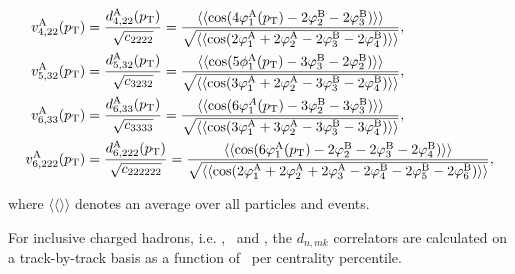 \documentclass[ALICE,manyauthors]{cernphprep}
\providecommand{\DIFaddbegin}{} %
\begin{document}
\begin{align}
v_{4,22}^{\rm{A}}(p_{\rm{T}}) &= \frac{d_{4,22}^{\rm{A}}(p_{\rm{T}})}{\sqrt{c_{2222}}} =  \frac{\langle\langle \cos(4\varphi^{\rm{A}}_{1}(p_{\rm{T}})-2\varphi^{\rm{B}}_{2}-2\varphi^{\rm{B}}_{3})\rangle\rangle}{\sqrt{\langle\langle \cos(2\varphi^{\rm{A}}_{1}+2\varphi^{\rm{A}}_{2}-2\varphi^{\rm{B}}_{3}-2\varphi^{\rm{B}}_{4}) \rangle\rangle}}, \label{Eq:VA422} \\
v_{5,32}^{\rm{A}}(p_{\rm{T}}) &= \frac{d_{5,32}^{\rm{A}}(p_{\rm{T}})}{\sqrt{c_{3232}}} = \frac{\langle\langle \cos(5\phi^{\rm{A}}_{1}(p_{\rm{T}})-3\varphi^{\rm{B}}_{3}-2\varphi^{\rm{B}}_{2})\rangle\rangle}{\sqrt{\langle\langle \cos(3\varphi^{\rm{A}}_{1}+2\varphi^{\rm{A}}_{2}-3\varphi^{\rm{B}}_{3}-2\varphi^{\rm{B}}_{4}) \rangle\rangle}}, \label{Eq:VA532}\\
v_{6,33}^{\rm{A}}(p_{\rm{T}}) &= \frac{d_{6,33}^{\rm{A}}(p_{\rm{T}})}{\sqrt{c_{3333}}} =\frac{\langle\langle \cos(6\varphi^{A}_{1}(p_{\rm{T}})-3\varphi^{\rm{B}}_{2}-3\varphi^{\rm{B}}_{3})\rangle\rangle}{\sqrt{\langle\langle \cos(3\varphi^{\rm{A}}_{1}+3\varphi^{\rm{A}}_{2}-3\varphi^{\rm{B}}_{3}-3\varphi^{\rm{B}}_{4}) \rangle\rangle}}, \label{Eq:VA633}\\
v_{6,222}^{\rm{A}}(p_{\rm{T}}) &= \frac{d_{6,222}^{\rm{A}}(p_{\rm{T}})}{\sqrt{c_{222222}}} =\frac{\langle\langle \cos(6\varphi^{\rm{A}}_{1}(p_{\rm{T}})-2\varphi^{\rm{B}}_{2}-2\varphi^{\rm{B}}_{3}-2\varphi^{\rm{B}}_{4})\rangle\rangle}{\sqrt{\langle\langle \cos(2\varphi^{\rm{A}}_{1}+2\varphi^{\rm{A}}_{2}+2\varphi^{\rm{A}}_{3}-2\varphi^{\rm{B}}_{4}-2\varphi^{\rm{B}}_{5}-2\varphi^{\rm{B}}_{6}) \rangle\rangle}},
\label{Eq:VA6222}
\end{align}

where $\langle\langle\rangle\rangle$ denotes an average over all particles and events.


For inclusive charged hadrons, i.e. \pion, \kaon~and \proton, the $d_{n,mk}$ correlators are calculated on a track-by-track basis as a function of \pT~per centrality percentile. 
\DIFaddbegin 
\end{document}
